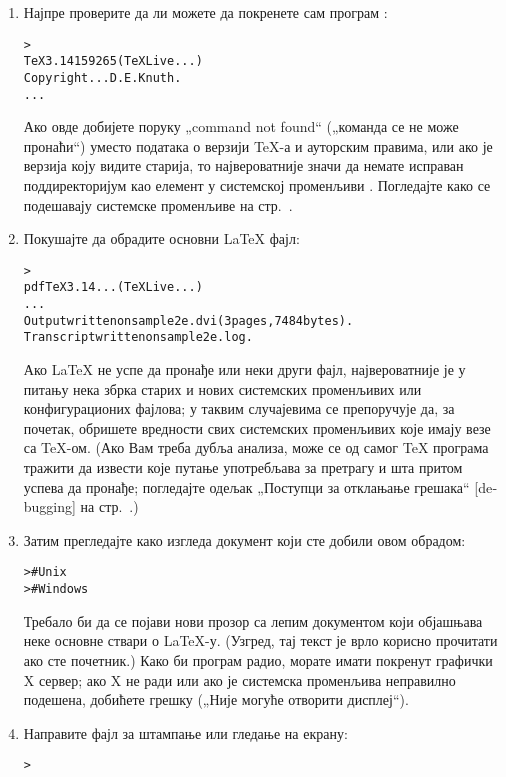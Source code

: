 \documentclass{article}
\begin{document}
\begin{enumerate}

\item Најпре проверите да ли можете да покренете сам програм
  :
\begin{alltt}> 
TeX 3.14159265 (TeX Live ...)
Copyright ... D.E. Knuth.
...
\end{alltt}
Ако овде добијете поруку „command not found“ („команда се не може
пронаћи“) уместо података о верзији \TeX-а и ауторским правима, или
ако је верзија коју видите старија, то највероватније значи да немате
исправан поддиректоријум  као елемент у системској
променљиви . Погледајте како се подешавају системске
променљиве на стр.~\pageref{sec:env}.

\item Покушајте да обрадите основни \LaTeX{} фајл:
\begin{alltt}> 
pdfTeX 3.14... (TeX Live ...)
...
Output written on sample2e.dvi (3 pages, 7484 bytes).
Transcript written on sample2e.log.
\end{alltt}
Ако \LaTeX{} не успе да пронађе  или неки
други фајл, највероватније је у питању нека збрка старих и нових
системских променљивих или конфигурационих фајлова; у таквим
случајевима се препоручује да, за почетак, обришете вредности свих
системских променљивих које имају везе са \TeX-ом. (Ако Вам треба
дубља анализа, може се од самог \TeX{} програма тражити да извести
које путање употребљава за претрагу и шта притом успева да пронађе;
погледајте одељак „Поступци за отклањање грешака“
[\textenglish{debugging}] на стр.~\pageref{sec:debugging}.)

\item Затим прегледајте како изгледа документ који сте добили овом
  обрадом:
\begin{alltt}>     # Unix
>   # Windows
\end{alltt}
Требало би да се појави нови прозор са лепим документом који
објашњава неке основне ствари о \LaTeX{}-у. (Узгред, тај текст је
врло корисно прочитати ако сте почетник.) Како би програм
 радио, морате имати покренут графички X сервер; ако X
не ради или ако је системска променљива  неправилно
подешена, добићете грешку  („Није могуће
отворити дисплеј“).

\item Направите \PS{} фајл за штампање или гледање на екрану:
\begin{alltt}> 
\end{alltt}


\end{enumerate}
\end{document}
